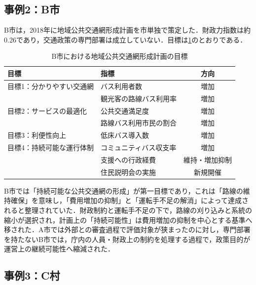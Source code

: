 \subsection{事例2：B市}
\label{subsec:ch5_cityB}

B市は，2018年に地域公共交通網形成計画を市単独で策定した．財政力指数は約0.26であり，交通政策の専門部署は成立していない．目標は\ref{tab:city_b}のとおりである．

\begin{table}[htb]
\caption{B市における地域公共交通網形成計画の目標}
\label{tab:city_b}
\centering
\small
\begin{tabular}{|p{3cm}|p{5cm}|c|}\hline
目標 & 指標 & 方向 \\\hline
目標1：分かりやすい交通網 & バス利用者数 & 増加 \\
 & 観光客の路線バス利用率 & 増加 \\\hline
目標2：サービスの最適化 & 公共交通満足度 & 増加 \\
 & 路線バス利用市民の割合 & 増加 \\\hline
目標3：利便性向上 & 低床バス導入数 & 増加 \\\hline
目標4：持続可能な運行体制 & コミュニティバス収支率 & 増加 \\
 & 支援への行政経費 & 維持・増加抑制 \\
 & 住民説明会の実施 & 新規開催 \\\hline
\end{tabular}
\end{table}

B市では「持続可能な公共交通網の形成」が第一目標であり，これは「路線の維持確保」を意味し，「費用増加の抑制」と「運転手不足の解消」によって達成されると整理されていた．財政制約と運転手不足の下で，路線の刈り込みと系統の縮小が選択され，計画上の「持続可能性」は費用増加の抑制を中心とする基準へ移された．A市では外部との審査過程で評価対象が狭まったのに対し，専門部署を持たないB市では，庁内の人員・財政上の制約を処理する過程で，政策目的が運営上の継続可能性へ縮減された．

\subsection{事例3：C村}
\label{subsec:ch5_villageC}

